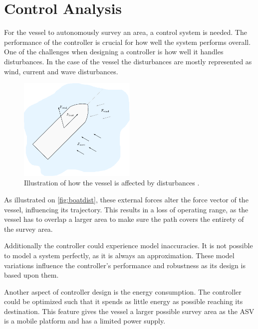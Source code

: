 \section{Control Analysis}
For the vessel to autonomously survey an area, a control system is needed. 
The performance of the controller is crucial for how well the system performs overall. 
One of the challenges when designing a controller is how well it handles disturbances. 
In the case of the vessel the disturbances are mostly represented as wind, current and wave disturbances. 
\begin{figure}[H]
    \includegraphics[width=0.5\textwidth]{figures/boatdisturbance}
    \caption{Illustration of how the vessel is affected by disturbances .}
    \label{fig:boatdist}
\end{figure}

As illustrated on \autoref{fig:boatdist}, these external forces alter the force vector of the vessel, influencing its trajectory. This results in a loss of operating range, as the vessel has to overlap a larger area to make sure the path covers the entirety of the survey area.

Additionally the controller could experience model inaccuracies. 
It is not possible to model a system perfectly, as it is always an approximation. 
These model variations influence the controller's performance and robustness as its design is based upon them. 

Another aspect of controller design is the energy consumption. The controller could be optimized such that it spends as little energy as possible reaching its destination. This feature gives the vessel a larger possible survey area as the ASV is a mobile platform and has a limited power supply. 

